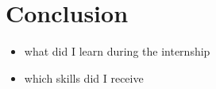 \documentclass[../00_main.tex]{subfiles}
\begin{document}
\section{Conclusion}

\begin{itemize}
    \item what did I learn during the internship
    \item which skills did I receive
\end{itemize}
\end{document}
